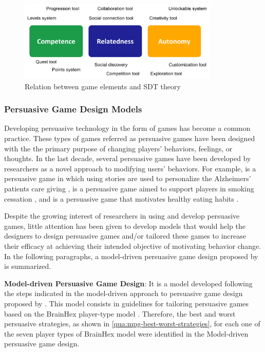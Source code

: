\begin{figure}[htb]
 \caption{Relation between game elements and SDT theory}
 \label{fig:sdt-game-elements}
 \centering
 \includegraphics[width=0.85\textwidth]{images/chap-general-background/sdt-game-elements.png}
 \fautor
\end{figure}


\subsubsection{Persuasive Game Design Models}
\label{subsub:persuasive-game-design-models}

Developing persuasive technology in the form of games has become a common practice. These types of games referred as persuasive games have been designed with the the primary purpose of changing  players' behaviors, feelings, or thoughts. In the last decade, several persuasive games have been developed by researchers as a novel approach to modifying users' behaviors. For example,  is a persuasive game in which using stories are used to personalize the Alzheimers' patients care giving \cite{CadamuroVisch2013},  is a persuasive game aimed to support players in smoking cessation \cite{KhaledBarrNobleFischerBiddle2007a}, and  is a persuasive
game that motivates healthy eating habits \cite{GrimesKantrooGrinter2010}.

Despite the growing interest of researchers in using and develop persuasive games, little attention has been given to develop models that would help the designers to design persuasive games and/or tailored these games to increase their efficacy at achieving their intended objective of motivating behavior change. In the following paragraphs, a model-driven persuasive game design proposed by \cite{OrjiVassilevaMandryk2014} is summarized.

\textbf{Model-driven Persuasive Game Design}: It is a model developed following the steps indicated in the model-driven approach to persuasive game design proposed by \cite{Orji2014}. This model consists in guidelines for tailoring persuasive games based on the BrainHex player-type model \cite{NackeBatemanMandryk2014}. Therefore, the best and worst persuasive strategies, as shown in \autoref{qua:mpg-best-worst-strategies}, for each one of the seven player types of BrainHex model were identified in the Model-driven persuasive game design.


